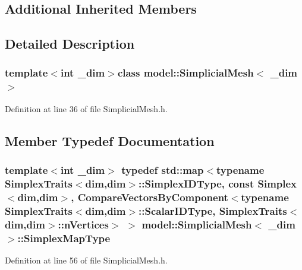 \subsection*{Additional Inherited Members}


\subsection{Detailed Description}
\subsubsection*{template$<$int \+\_\+dim$>$class model\+::\+Simplicial\+Mesh$<$ \+\_\+dim $>$}



Definition at line 36 of file Simplicial\+Mesh.\+h.



\subsection{Member Typedef Documentation}
\hypertarget{classmodel_1_1_simplicial_mesh_aa65b22398919503e2183a0cbe5e0f2e7}{}
\subsubsection[{Simplex\+Map\+Type}]{\setlength{\rightskip}{0pt plus 5cm}template$<$int \+\_\+dim$>$ typedef std\+::map$<$typename {\bf Simplex\+Traits}$<${\bf dim},{\bf dim}$>$\+::Simplex\+I\+D\+Type, const {\bf Simplex}$<${\bf dim},{\bf dim}$>$, {\bf Compare\+Vectors\+By\+Component}$<$typename {\bf Simplex\+Traits}$<${\bf dim},{\bf dim}$>$\+::Scalar\+I\+D\+Type, {\bf Simplex\+Traits}$<${\bf dim},{\bf dim}$>$\+::n\+Vertices$>$ $>$ {\bf model\+::\+Simplicial\+Mesh}$<$ \+\_\+dim $>$\+::{\bf Simplex\+Map\+Type}}\label{classmodel_1_1_simplicial_mesh_aa65b22398919503e2183a0cbe5e0f2e7}


Definition at line 56 of file Simplicial\+Mesh.\+h.



